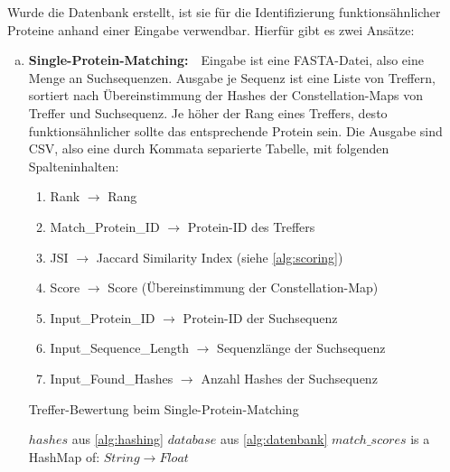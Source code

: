         Wurde die Datenbank erstellt, ist sie für die Identifizierung funktionsähnlicher Proteine anhand einer Eingabe verwendbar. Hierfür gibt es zwei Ansätze:
        \begin{enumerate}[a)]
            \item {}
                \textbf{Single-Protein-Matching:}\ \ Eingabe ist eine FASTA-Datei, also eine Menge an Suchsequenzen. Ausgabe je Sequenz ist eine Liste von Treffern, sortiert nach Übereinstimmung der Hashes der Constellation-Maps von Treffer und Suchsequenz. Je höher der Rang eines Treffers, desto funktionsähnlicher sollte das entsprechende Protein sein. Die Ausgabe sind \ac{CSV}, also eine durch Kommata separierte Tabelle, mit folgenden Spalteninhalten:
            \begin{enumerate}[1.]
                \item Rank $\rightarrow$ Rang
                \item Match\_Protein\_ID $\rightarrow$ Protein-ID des Treffers
                \item JSI $\rightarrow$ Jaccard Similarity Index (siehe \autoref{alg:scoring})
                \item Score $\rightarrow$ Score (Übereinstimmung der Constellation-Map)
                \item Input\_Protein\_ID $\rightarrow$ Protein-ID der Suchsequenz
                \item Input\_Sequence\_Length $\rightarrow$ Sequenzlänge der Suchsequenz
                \item Input\_Found\_Hashes $\rightarrow$ Anzahl Hashes der Suchsequenz
            \end{enumerate}

            \newcommand{\Width}{\dimexpr\textwidth-\leftmargin}
            \begin{minipage}{\Width}
                \begin{algorithm}[H]
                    \caption{Treffer-Bewertung beim Single-Protein-Matching}\label{alg:scoring}
                    \begin{algorithmic}
                        \Require $hashes$ aus \autoref{alg:hashing}
                        \Require $database$ aus \autoref{alg:datenbank}
                        \Ensure $match\_scores$ is a HashMap of: $String \rightarrow Float$


\end{algorithmic}
\end{algorithm}
\end{minipage}
\end{enumerate}
